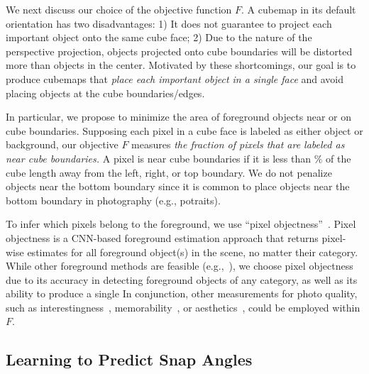 We next discuss our choice of the objective function $F$.  
A cubemap in its default orientation has two disadvantages: 1) It does not guarantee to project each important object onto the same cube face; 2) Due to the nature of the perspective projection, objects projected onto cube boundaries will be distorted more than objects in the center.  Motivated by these shortcomings, our goal is to produce cubemaps that \emph{place each important object in a single face} and avoid placing objects at the cube boundaries/edges. 

In particular, we propose to minimize the area of foreground objects near or on cube boundaries. 
Supposing each pixel in a cube face is  labeled as either object or background, our objective $F$ measures \emph{the fraction of pixels that are labeled as  near cube boundaries.}  A pixel is near cube boundaries if it is less than \% of the cube length away from the left, right, or top boundary. We do not penalize objects near the bottom boundary since it is common to place objects near the bottom boundary in photography (e.g., potraits).

To infer which pixels belong to the foreground, we use ``pixel objectness''~\cite{jain2017pixel}.  Pixel objectness is a CNN-based foreground estimation approach that returns pixel-wise estimates for all foreground object(s) in the scene, no matter their category.  While other foreground methods are feasible (e.g.,~\cite{zitnick2014edge,carreira2012cpmc,jiang2013,pinheiro2015learning,liu2011learning}), we choose pixel objectness due to its accuracy in detecting foreground objects of any category, as well as its ability to produce a single 
In conjunction, other measurements for photo quality, such as interestingness~\cite{gygli2013interestingness}, memorability~\cite{isola2011makes}, or aesthetics~\cite{dhar2011high}, could be employed within $F$.  



\subsection{Learning to Predict Snap Angles}\label{sec:model}




